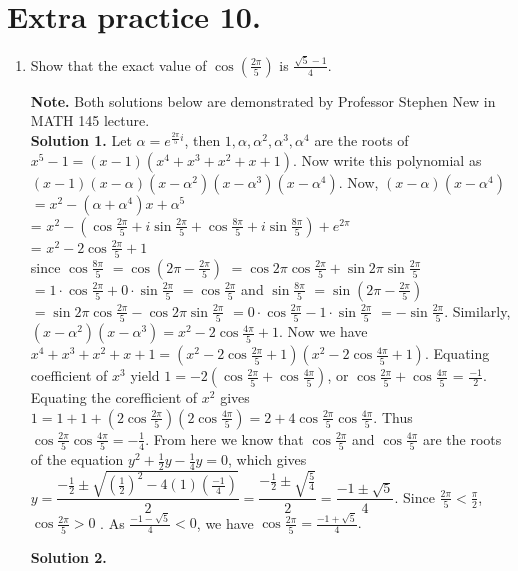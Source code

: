 \documentclass[11pt]{article}
\begin{document}
\section{Extra practice 10.}
\begin{enumerate}
\item Show that the exact value of $\cos\left(\frac{2\pi}{5}\right)$ is $\frac{\sqrt{5}-1}{4}$.

\textbf{Note.} Both solutions below are demonstrated by Professor Stephen New in MATH 145 lecture.\\
\textbf {Solution 1.} Let $\alpha=e^{\frac{2\pi}{5}i}$, then $1, \alpha, \alpha^2, \alpha^3, \alpha^4$ are the roots of $x^5-1=(x-1)(x^4+x^3+x^2+x+1)$. Now write this polynomial as $(x-1)(x-\alpha)(x-\alpha^2)(x-\alpha^3)(x-\alpha^4)$. 
Now, $(x-\alpha)(x-\alpha^4)$\\
$=x^2-(\alpha+\alpha^4)x+\alpha^5$\\
= $x^2-(\cos \frac{2\pi}{5}+i\sin\frac{2\pi}{5}+\cos\frac{8\pi}{5}+i\sin\frac{8\pi}{5})+e^{2\pi}$\\
= $x^2-2\cos\frac{2\pi}{5}+1$ \\
since
$\cos \frac{8\pi}{5}$
$=\cos(2\pi-\frac{2\pi}{5})$
$=\cos 2\pi \cos\frac{2\pi}{5}+\sin 2\pi \sin\frac{2\pi}{5}$
$=1\cdot \cos \frac{2\pi}{5}+0\cdot \sin \frac{2\pi}{5}$
$=\cos \frac{2\pi}{5}$
and
$\sin \frac{8\pi}{5}$
$=\sin(2\pi-\frac{2\pi}{5})$
$=\sin 2\pi \cos\frac{2\pi}{5}-\cos 2\pi \sin\frac{2\pi}{5}$
$=0\cdot \cos \frac{2\pi}{5}-1\cdot \sin \frac{2\pi}{5}$
$=-\sin \frac{2\pi}{5}$.
 Similarly, $(x-\alpha^2)(x-\alpha^3)=x^2-2\cos\frac{4\pi}{5}+1$. Now we have $x^4+x^3+x^2+x+1=(x^2-2\cos\frac{2\pi}{5}+1)(x^2-2\cos\frac{4\pi}{5}+1)$. Equating coefficient of $x^3$ yield $1=-2(\cos\frac{2\pi}{5}+\cos\frac{4\pi}{5})$, or $\cos\frac{2\pi}{5}+\cos\frac{4\pi}{5}$ = $\frac{-1}{2}$. Equating the corefficient of $x^2$ gives $1=1+1+(2\cos\frac{2\pi}{5})(2\cos\frac{4\pi}{5})=2+4\cos\frac{2\pi}{5}\cos\frac{4\pi}{5}$. Thus $\cos\frac{2\pi}{5}\cos\frac{4\pi}{5}=-\frac{1}{4}$. From here we know that $\cos\frac{2\pi}{5}$ and $\cos\frac{4\pi}{5}$ are the roots of the equation $y^2+\frac{1}{2}y-\frac{1}{4}y=0$, which gives $y=\dfrac{-\frac{1}{2}\pm\sqrt{(\frac{1}{2})^2-4(1)(\frac{-1}{4})}}{2}=\dfrac{-\frac{1}{2}\pm\sqrt{\frac{5}{4}}}{2}=\dfrac{-1\pm\sqrt{5}}{4}.$ Since $\frac{2\pi}{5}<\frac{\pi}{2}$, $\cos\frac{2\pi}{5}>0$ . As $\frac{-1-\sqrt{5}}{4}<0$, we have $\cos\frac{2\pi}{5}=\frac{-1+\sqrt{5}}{4}.$

\textbf {Solution 2.}


\end{enumerate}
\end{document}
